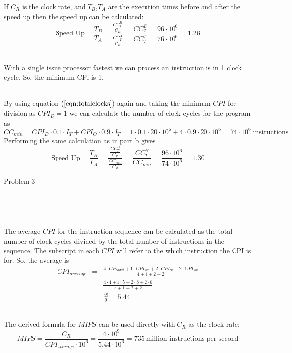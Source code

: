 \documentclass[11pt,reqno]{article}
\begin{document}
If $C_R$ is the clock rate, and $T_B$,$T_A$ are the execution times before and after the speed up then the speed up can be calculated:
\[ \text{Speed Up} =  \frac{T_B}{T_A} = \frac{\frac{CC_T^B}{C_R}}{\frac{CC_T^A}{C_R}} = \frac{CC_T^B}{CC_T^A} = \frac{96 \cdot 10^6}{76 \cdot 10^6} = 1.26\]

\noindent {}\\ 

With a single issue processor fastest we can process an instruction is in 1 clock cycle. So, the minimum CPI is 1.

\newpage
\noindent {}\\ 

By using equation $(\ref{eqn:totalclocks})$ again and taking the minimum $CPI$ for division as $CPI_D = 1$ we can calculate the number of clock cycles for the program as\\
\[ CC_{min} = CPI_D \cdot 0.1 \cdot I_T  + CPI_O \cdot 0.9 \cdot I_T  = 1\cdot 0.1 \cdot 20 \cdot 10^6 + 4 \cdot 0.9 \cdot 20 \cdot 10^6  = 74 \cdot 10^6 \; \text{instructions}\]
Performing the same calculation as in part b gives
\[ \text{Speed Up} =  \frac{T_B}{T_A} = \frac{\frac{CC_T^B}{C_R}}{\frac{CC_{min}}{C_R}} = \frac{CC_T^B}{CC_{min}} = \frac{96 \cdot 10^6}{74 \cdot 10^6} = 1.30\]

\begin{flushleft} 
Problem 3 \\
\rule{500pt}{1pt}\\
\end{flushleft} 
\\ 

The average $CPI$ for the instruction sequence can be calculated as the total number of clock cycles divided by the total number of instructions in the sequence. The subscript in each $CPI$ will refer to the which instruction the CPI is for. So, the average is 
\begin{eqnarray*}
CPI_{average} &=& \frac{4\cdot CPI_{addi} + 1\cdot CPI_{sub} +  2 \cdot CPI_{lw}  + 2 \cdot CPI_{sw}}{4+1+2+2} \\
			&=& \frac{4\cdot 4 + 1 \cdot 5 + 2 \cdot 8 + 2 \cdot 6}{4+1+2+2} \\
			&=& \frac{49}{9} = 5.44
\end{eqnarray*}

\noindent{}\\ 

The derived formula for $MIPS$ can be used directly with $C_R$ as the clock rate:
\begin{equation*}
MIPS = \frac{C_R}{CPI_{average} \cdot 10^6} =  \frac{4 \cdot 10^9}{5.44 \cdot 10^6} = 735 \; \text{million instructions per second}
\end{equation*}
\end{document}
